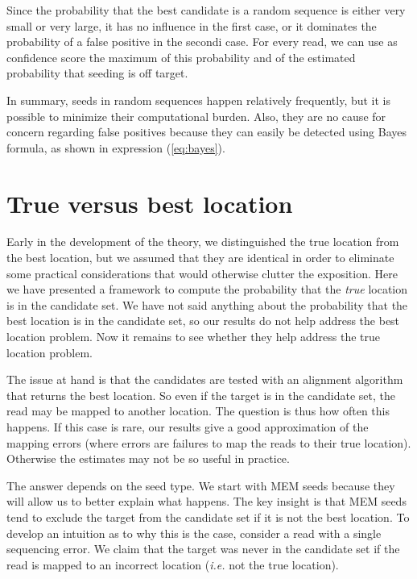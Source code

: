 \documentclass{article}
\begin{document}
Since the probability that the best candidate is a random sequence is
either very small or very large, it has no influence in the first case,
or it dominates the probability of a false positive in the secondi case.
For every read, we can use as confidence score the maximum of this
probability and of the estimated probability that seeding is off target.

In summary, seeds in random sequences happen relatively frequently, but it
is possible to minimize their computational burden. Also, they are no
cause for concern regarding false positives because they can easily be
detected using Bayes formula, as shown in expression (\ref{eq:bayes}).


\section{True versus best location}
\label{sec:truevsbest}

Early in the development of the theory, we distinguished the true location
from the best location, but we assumed that they are identical in order to
eliminate some practical considerations that would otherwise clutter the
exposition. Here we have presented a framework to compute the probability
that the \emph{true} location is in the candidate set. We have not said
anything about the probability that the best location is in the candidate
set, so our results do not help address the best location problem. Now it
remains to see whether they help address the true location problem.

The issue at hand is that the candidates are tested with an alignment
algorithm that returns the best location. So even if the target is in the
candidate set, the read may be mapped to another location. The question is
thus how often this happens. If this case is rare, our results give a good
approximation of the mapping errors (where errors are failures to map the
reads to their true location). Otherwise the estimates may not be so
useful in practice.

The answer depends on the seed type. We start with MEM seeds because they
will allow us to better explain what happens. The key insight is that MEM
seeds tend to exclude the target from the candidate set if it is not the
best location. To develop an intuition as to why this is the case,
consider a read with a single sequencing error. We claim that the target
was never in the candidate set if the read is mapped to an incorrect
location (\textit{i.e.} not the true location).
\end{document}
